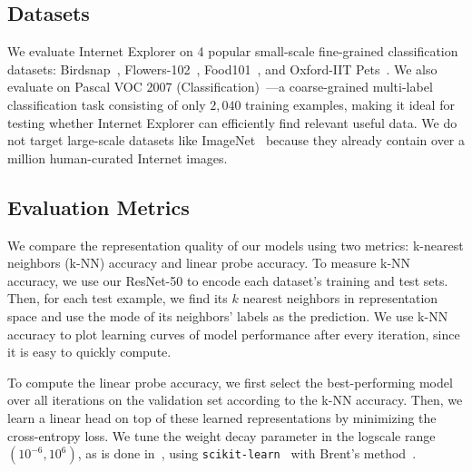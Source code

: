 \subsection{Datasets}
We evaluate Internet Explorer on 4 popular small-scale fine-grained classification datasets: Birdsnap~\cite{berg2014birdsnap}, Flowers-102~\cite{nilsback2008automated}, Food101~\cite{bossard2014food}, and Oxford-IIT Pets~\cite{parkhi2012cats}.
We also evaluate on Pascal VOC 2007 (Classification)~\cite{everingham2010pascal}---a coarse-grained multi-label classification task consisting of only $2{,}040$ training examples, making it ideal for testing whether Internet Explorer can efficiently find relevant useful data.
We do not target large-scale datasets like ImageNet~\cite{deng2009imagenet} because they already contain over a million human-curated Internet images.

\subsection{Evaluation Metrics}
We compare the representation quality of our models using two metrics: k-nearest neighbors (k-NN) accuracy  and linear probe accuracy. To measure k-NN accuracy, we use our ResNet-50 to encode each dataset's training and test sets. Then, for each test example, we find its $k$ nearest neighbors in representation space and use the mode of its neighbors' labels as the prediction. We use k-NN accuracy to plot learning curves of model performance after every iteration, since it is easy to quickly compute.

To compute the linear probe accuracy, we first select the best-performing model over all iterations on the validation set according to the k-NN accuracy. Then, we learn a linear head on top of these learned representations by minimizing the cross-entropy loss. We tune the weight decay parameter in the logscale range $(10^{-6}, 10^6)$, as is done in~\cite{radford2021learning}, using \texttt{scikit-learn}~\cite{pedregosa2011scikit} with Brent's method~\cite{brent1973algorithms}.


